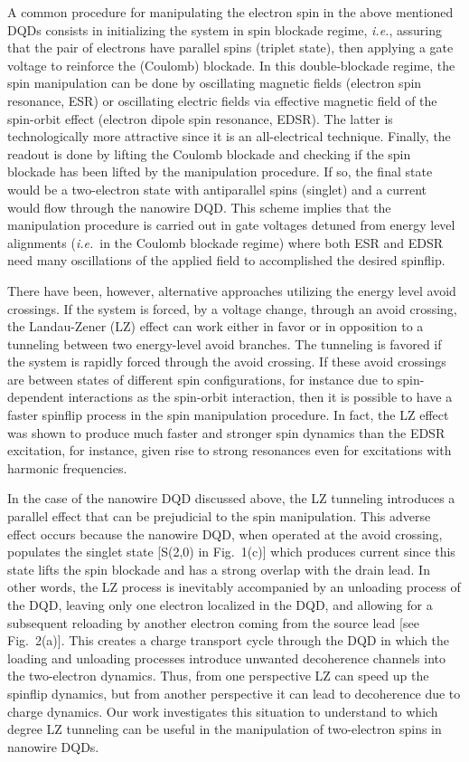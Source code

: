 \documentclass[prb,twocolumn,showpacs,floats]{revtex4}
\begin{document}
A common procedure for manipulating the electron spin in the above mentioned DQDs consists in initializing the system in
spin blockade regime, \textit{i.e.}, assuring that the pair of electrons have parallel spins (triplet state), then applying a gate voltage 
to reinforce the (Coulomb) blockade.\cite{petta-dots} In this double-blockade regime, the spin manipulation 
can be done by oscillating magnetic fields 
(electron spin resonance, ESR) or oscillating electric fields via effective magnetic field of the spin-orbit effect
(electron dipole spin resonance, EDSR). The latter is technologically
more attractive since it is an all-electrical technique.
Finally, the readout is done by lifting the Coulomb blockade and checking if the spin blockade has been 
lifted by the manipulation procedure. If so, the final state would be a two-electron 
state with antiparallel spins (singlet) and a current would flow through the nanowire DQD. 
This scheme implies that the manipulation procedure is carried out in gate voltages detuned from energy level alignments 
(\textit{i.e.}~in the Coulomb blockade regime) where both ESR and EDSR need many oscillations of the applied field to accomplished
the desired spinflip.

There have been, however, alternative approaches utilizing the energy level avoid crossings.\cite{hugo} If the system 
is forced, by a voltage change, through an avoid crossing, 
the Landau-Zener (LZ)\cite{landau, zener} effect can work either in
favor or in opposition to a tunneling between two energy-level avoid branches. The tunneling is favored if the system
is rapidly forced through the avoid crossing. If these avoid crossings are between states
of different spin configurations, for instance due to spin-dependent interactions 
as the spin-orbit interaction, then it is possible to have a faster spinflip process in
the spin manipulation procedure. In fact, the LZ effect was shown to produce much faster 
and stronger spin dynamics than the EDSR excitation, for instance, given rise to strong resonances even 
for excitations with harmonic frequencies.\cite{petta-prl}

In the case of the nanowire DQD discussed above, the LZ tunneling introduces a parallel effect that can
be prejudicial to the spin manipulation. This adverse effect occurs because the nanowire DQD, when operated at the
avoid crossing, populates the singlet state [S(2,0) in Fig.~1(c)] which produces current since this state lifts the
spin blockade and has a strong overlap with the drain lead.
In other words, the LZ process is inevitably accompanied by an unloading process
of the DQD, leaving only one electron localized in the DQD, and allowing for a subsequent reloading by another
electron coming from the source lead [see Fig.~2(a)]. This creates a charge transport cycle through the
DQD in which the loading and unloading processes 
introduce unwanted decoherence channels into the two-electron dynamics. Thus,
from one perspective LZ can speed up the spinflip dynamics, but from another
perspective it can lead to decoherence due to charge dynamics.\cite{hugo,hugo2}
 Our work investigates this situation to understand
to which degree LZ tunneling can be useful in the manipulation of two-electron spins in nanowire DQDs.
 
\end{document}
